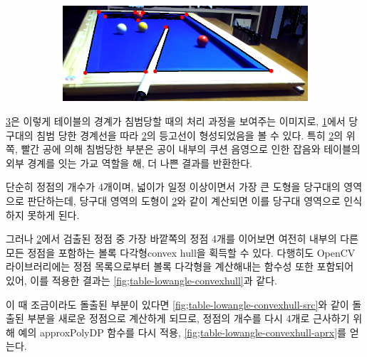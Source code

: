 \documentclass[10pt]{oblivoir}
\newcommand{\textss}[1]{\scriptsize#1\normalsize}
\begin{document}
\begin{figure}[ht]
\begin{subfigure}{8cm}
        \caption{}
        \label{fig;table-lowangle-edge}
    \end{subfigure}
    \centering
    \begin{subfigure}{8cm}
        \includegraphics[width=\textwidth]{img/billiards-table-low-angle-approx.png}
        \caption{}
        \label{fig;table-lowangle-aprx}
    \end{subfigure}
    \caption{}
    \label{fig;table-lowangle}
\end{figure}

\cref{fig;table-lowangle}은 이렇게 테이블의 경계가 침범당할 때의 처리 과정을 보여주는 이미지로, \cref{fig;table-lowangle-edge}에서 당구대의 침범 당한 경계선을 따라 \cref{fig;table-lowangle-aprx}의 등고선이 형성되었음을 볼 수 있다. 특히 \cref{fig;table-lowangle-aprx}의 위쪽, 빨간 공에 의해 침범당한 부분은 공이 내부의 쿠션 음영으로 인한 잡음와 테이블의 외부 경계를 잇는 가교 역할을 해, 더 나쁜 결과를 반환한다.

단순히 정점의 개수가 4개이며, 넓이가 일정 이상이면서 가장 큰 도형을 당구대의 영역으로 판단하는데, 당구대 영역의 도형이 \cref{fig;table-lowangle-aprx}와 같이 계산되면 이를 당구대 영역으로 인식하지 못하게 된다.

그러나 \cref{fig;table-lowangle-aprx}에서 검출된 정점 중 가장 바깥쪽의 정점 4개를 이어보면 여전히 내부의 다른 모든 정점을 포함하는 볼록 다각형\textss{convex hull}을 획득할 수 있다. 다행히도 OpenCV 라이브러리에는 정점 목록으로부터 볼록 다각형을 계산해내는 함수성 또한 포함되어 있어, 이를 적용한 결과는 \cref{fig;table-lowangle-convexhull}과 같다.

이 때 조금이라도 돌출된 부분이 있다면 \cref{fig;table-lowangle-convexhull-src}와 같이 돌출된 부분을 새로운 정점으로 계산하게 되므로, 정점의 개수를 다시 4개로 근사하기 위해 예의 approxPolyDP 함수를 다시 적용, \cref{fig;table-lowangle-convexhull-aprx}를 얻는다.
\end{document}
